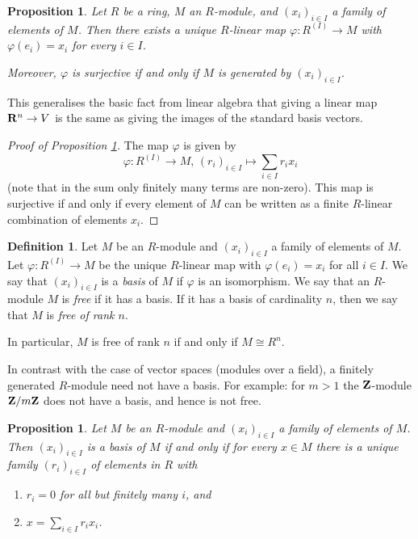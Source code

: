 \documentclass[11pt]{amsbook}
\theoremstyle{plain}
\newtheorem{proposition}[theorem]{Proposition}
\theoremstyle{definition}
\newtheorem{definition}[theorem]{Definition}
\begin{document}
\begin{proposition}\label{prop:universal-property-free-module}
Let $R$ be a ring, $M$ an $R$-module, and $(x_i)_{i \in I}$ a family of elements of $M$. Then there exists a unique 
$R$-linear map $\varphi\colon R^{(I)} \to M$ with $\varphi(e_i)=x_i$ for every $i\in I$. 

Moreover,  $\varphi$ is surjective if and only if $M$ is generated by $(x_i)_{i\in I}$.
\end{proposition}

This generalises the basic fact from linear algebra that giving a linear map ${\mathbf{R}}^n\to V$ is the same as giving the images of the standard basis vectors.

\begin{proof}[Proof of Proposition \ref{prop:universal-property-free-module}]
The map $\varphi$ is given by
\[
	\varphi\colon R^{(I)} \to M,\, (r_i)_{i\in I} \mapsto \sum_{i\in I} r_i x_i
\]
(note that in the sum only finitely many terms are non-zero). This map is surjective if and only if every
element of $M$ can be written as a finite $R$-linear combination of elements $x_i$.
\end{proof}

\begin{definition}
Let $M$ be an $R$-module and $(x_i)_{i \in I}$ a family of elements of $M$. Let $\varphi\colon R^{(I)} \to M$ be the unique $R$-linear map with
$\varphi(e_i)=x_i$ for all $i\in I$. We say that $(x_i)_{i\in I}$ is a \emph{basis} of $M$ if $\varphi$ is an isomorphism. We say that an $R$-module $M$ is \emph{free} if it has a basis. If it has a basis of cardinality $n$, then we say that $M$ is \emph{free of rank $n$}.
\end{definition}

In particular, $M$ is free of rank $n$ if and only if $M\cong R^n$.


In contrast with the case of vector spaces (modules over a field), a finitely generated $R$-module need not have a basis. For example: for $m> 1$ the ${\mathbf{Z}}$-module ${\mathbf{Z}}/m{\mathbf{Z}}$ does not have a basis, and hence is not free.

\begin{proposition}\label{prop:equivalent-def-basis}
Let $M$ be an $R$-module and $(x_i)_{i \in I}$ a family of elements of $M$. Then $(x_i)_{i\in I}$ is a basis of $M$ if and only if for every $x\in M$ there 
is a unique family $(r_i)_{i\in I}$ of elements in $R$ with
\begin{enumerate}
\item $r_i=0$ for all but finitely many $i$, and
\item   $x=\sum_{i\in I} r_i x_i$.
\end{enumerate}
\end{proposition}
\end{document}
